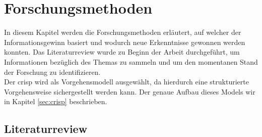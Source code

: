 \documentclass[
    12pt, %
    DIV10,
    ngerman, %
    a4paper, %
    oneside, %
    titlepage, %
    parskip=half, %
    headings=normal, %
    listof=totoc, %
    bibliography=totoc, %
    index=totoc, %
    captions=tableheading, %
    final %
]{scrreprt}
\begin{document}
\chapter{Forschungsmethoden}
In diesem Kapitel werden die Forschungsmethoden erläutert, auf welcher der Informationsgewinn basiert und wodurch neue Erkenntnisse gewonnen werden konnten. Das Literaturreview wurde zu Beginn der Arbeit durchgeführt, um Informationen bezüglich des Themas zu sammeln und um den momentanen Stand der Forschung zu identifizieren.\\
Der \ac{crisp} wird als Vorgehensmodell ausgewählt, da hierdurch eine strukturierte Vorgehensweise sichergestellt werden kann. Der genaue Aufbau dieses Models wir in Kapitel \ref{sec:crisp} beschrieben.
\section{Literaturreview}
\label{sec:lr}
\end{document}
